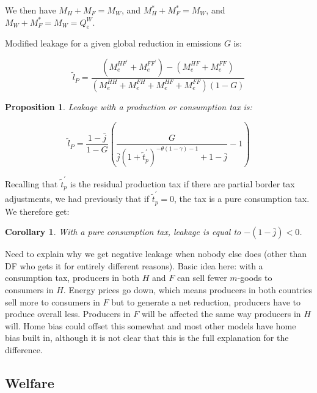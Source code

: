\documentclass[notitlepage,12pt]{article}
\newtheorem{corollary}[theorem]{Corollary}
\newtheorem{proposition}[theorem]{Proposition}
\begin{document}
We then have $M_{H}+M_{F}=M_{W}$, and $M_{H}^{\ast }+M_{F}^{\ast }=M_{W}$,
and $M_{W}+M_{F}^{\ast }=M_{W}=Q_{e}^{W}$. 

Modified leakage for a given global reduction in emissions $G$ is:\ 

\begin{equation*}
\tilde{l}_{P}=\frac{\left( M_{e}^{HF^{\prime }}+M_{e}^{FF^{\prime }}\right)
-\left( M_{e}^{HF}+M_{e}^{FF}\right) }{\left(
M_{e}^{HH}+M_{e}^{FH}+M_{e}^{HF}+M_{e}^{FF}\right) \left( 1-G\right) }
\end{equation*}

\begin{proposition}
Leakage with a production or consumption tax is:
\end{proposition}

\begin{equation*}
\tilde{l}_{P}=\frac{1-\bar{j}}{1-G}\left( \frac{G}{\bar{j}\left( 1+\tilde{t}%
_{p}^{\prime }\right) ^{-\theta \left( 1-\gamma \right) -1}+1-\bar{j}}%
-1\right) 
\end{equation*}

Recalling that $\tilde{t}_{p}^{\prime }$ is the residual production tax if
there are partial border tax adjustments, we had previously that if $\tilde{t%
}_{p}^{\prime }=0$, the tax is a pure consumption tax. We therefore get:

\begin{corollary}
With a pure consumption tax, leakage is equal to $-\left( 1-\bar{j}\right) <0
$.
\end{corollary}

Need to explain why we get negative leakage when nobody else does (other
than DF who gets it for entirely different reasons). Basic idea here: with a
consumption tax, producers in both $H$ and $F$ can sell fewer $m$-goods to
consumers in $H$. Energy prices go down, which means producers in both
countries sell more to consumers in $F$ but to generate a net reduction,
producers have to produce overall less. Producers in $F$ will be affected
the same way producers in $H$ will. Home bias could offset this somewhat and
most other models have home bias built in, although it is not clear that
this is the full explanation for the difference.

\subsection{Welfare\newline
}
\end{document}
